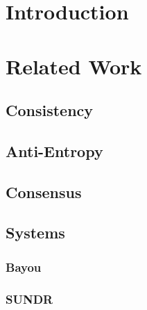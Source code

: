 \documentclass{article}
\begin{document}
\newpage
\tableofcontents

\newpage
\listoffigures

\newpage
\doublespacing



\section{Introduction}





\section{Related Work}

\subsection{Consistency}

\subsection{Anti-Entropy}

\subsection{Consensus}

\subsection{Systems}

\subsubsection{Bayou}

\subsubsection{SUNDR}
\end{document}

